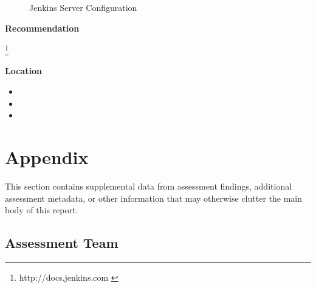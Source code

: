 \documentclass[11pt]{article}
\begin{document}
\begin{figure}[H]
    \centering
    \setlength{\fboxrule}{1pt} %
    \setlength{\fboxsep}{5pt}  %
    \caption{Jenkins Server Configuration}
\end{figure}

\lipsum[2][1-5]

\newpage

\textbf{Recommendation}

\lipsum[9]
\vspace{6pt}
\lipsum[6][1-2]
\vspace{6pt}
\lipsum[7][1-3]\footnote[1]{http://docs.jenkins.com \label{jenkins-server}}

\textbf{Location}

\begin{itemize}
    \item \lipsum[8][1]
    \item \lipsum[8][2]
    \item \lipsum[8][3]
\end{itemize}

\newpage

\section{Appendix}
This section contains supplemental data from assessment findings, additional assessment metadata, or other information that may otherwise clutter the main body of this report.

\subsection{Assessment Team}
\end{document}
